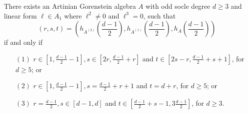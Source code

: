 \documentclass[12pt]{amsart}
\numberwithin{equation}{section}
\theoremstyle{plain} \newtheorem{theorem}{Theorem}[section]
\theoremstyle{definition} \newtheorem{definition}[theorem]{Definition}
\begin{document}
\begin{lemma}\label{maxvaluesoddLemma}
There exists an Artinian Gorenstein algebra $A$ with odd socle degree $d\geq 3$ and linear form $\ell\in A_1$ where $\ell^2\neq 0$ and $\ell^3=0$, such that 
$$
(r,s,t)=\left( h_{A^{(2)}}(\frac{d-1}{2}),  h_{A^{(1)}}(\frac{d-1}{2}),  h_{A}(\frac{d-1}{2})\right)
$$
if and only if 
\begin{itemize}
\item[$(1)$] $r\in [1,\frac{d-1}{2}-1], s\in[2r,\frac{d-1}{2}+r]$ and $t\in[2s-r,\frac{d-1}{2}+s+1]$, for $d\geq 5$; or 
\item[$(2)$] $r\in [1,\frac{d-1}{2}-1], s=\frac{d-1}{2}+r+1$ and $t=d+r$, for $d\geq 5$; or 
\item[$(3)$] $r=\frac{d-1}{2}, s\in [d-1,d]$ and $t\in [\frac{d-1}{2}+s-1,3\frac{d-1}{2}]$, for $d\geq 3$.
\end{itemize}
\end{lemma}
\end{document}
